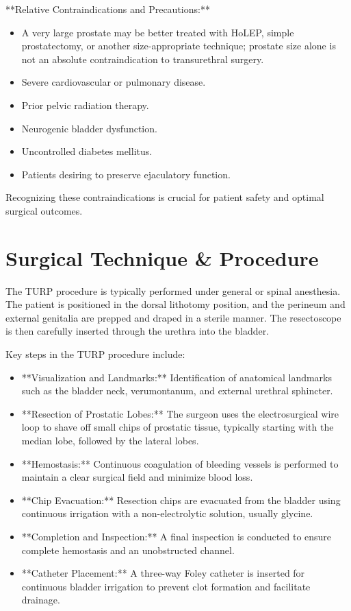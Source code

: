 **Relative Contraindications and Precautions:**
\begin{itemize}
  \item A very large prostate may be better treated with HoLEP, simple prostatectomy, or another size-appropriate technique; prostate size alone is not an absolute contraindication to transurethral surgery.
  \item Severe cardiovascular or pulmonary disease.
  \item Prior pelvic radiation therapy.
  \item Neurogenic bladder dysfunction.
  \item Uncontrolled diabetes mellitus.
  \item Patients desiring to preserve ejaculatory function.
\end{itemize}

Recognizing these contraindications is crucial for patient safety and optimal surgical outcomes.

\section*{Surgical Technique \& Procedure}
The TURP procedure is typically performed under general or spinal anesthesia. The patient is positioned in the dorsal lithotomy position, and the perineum and external genitalia are prepped and draped in a sterile manner. The resectoscope is then carefully inserted through the urethra into the bladder.

Key steps in the TURP procedure include:

\begin{itemize}
  \item **Visualization and Landmarks:** Identification of anatomical landmarks such as the bladder neck, verumontanum, and external urethral sphincter.
  \item **Resection of Prostatic Lobes:** The surgeon uses the electrosurgical wire loop to shave off small chips of prostatic tissue, typically starting with the median lobe, followed by the lateral lobes.
  \item **Hemostasis:** Continuous coagulation of bleeding vessels is performed to maintain a clear surgical field and minimize blood loss.
  \item **Chip Evacuation:** Resection chips are evacuated from the bladder using continuous irrigation with a non-electrolytic solution, usually glycine.
  \item **Completion and Inspection:** A final inspection is conducted to ensure complete hemostasis and an unobstructed channel.
  \item **Catheter Placement:** A three-way Foley catheter is inserted for continuous bladder irrigation to prevent clot formation and facilitate drainage.
\end{itemize}

